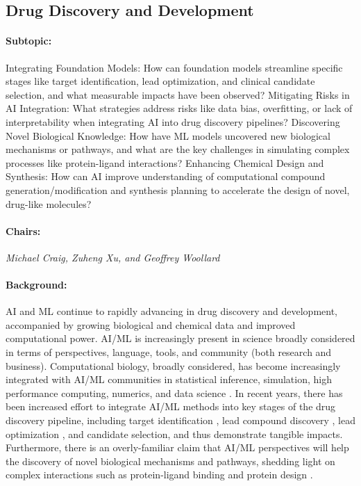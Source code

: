 \subsection{Drug Discovery and Development}

\paragraph{Subtopic:} 
Integrating Foundation Models: How can foundation models streamline specific stages like target identification, lead optimization, and clinical candidate selection, and what measurable impacts have been observed?  Mitigating Risks in AI Integration: What strategies address risks like data bias, overfitting, or lack of interpretability when integrating AI into drug discovery pipelines? Discovering Novel Biological Knowledge: How have ML models uncovered new biological mechanisms or pathways, and what are the key challenges in simulating complex processes like protein-ligand interactions? Enhancing Chemical Design and Synthesis: How can AI improve understanding of computational compound generation/modification and synthesis planning to accelerate the design of novel, drug-like molecules?

\paragraph{Chairs: }
\textit{Michael Craig, Zuheng Xu, and Geoffrey Woollard}

\paragraph{Background:}

AI and ML continue to rapidly advancing in drug discovery and development, accompanied by growing biological and chemical data and improved computational power. AI/ML is increasingly present in science broadly considered in terms of perspectives, language, tools, and community (both research and business). Computational biology, broadly considered, has become increasingly integrated with AI/ML communities in statistical inference, simulation, high performance computing, numerics, and data science \citep{Cranmer2020,Lavin2021,Hennig2022,Wang2024}. In recent years, there has been increased effort to integrate AI/ML methods into key stages of the drug discovery pipeline, including target identification \citep{hassanzadeh2016deeperbind}, lead compound discovery \citep{macedo2024medgan}, lead optimization \cite{pmlr-v108-korovina20a}, and candidate selection, and thus demonstrate tangible impacts. Furthermore, there is an overly-familiar claim that AI/ML perspectives will help the discovery of novel biological mechanisms and pathways, shedding light on complex interactions such as protein-ligand binding \citep{rezaei2020deep} and protein design \citep{TheNobelCommitteeforChemistry2024}.

